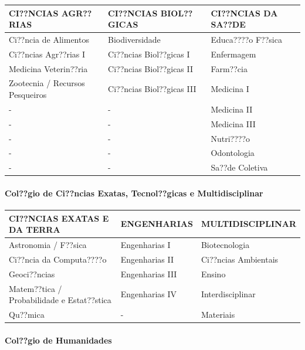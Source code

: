 \documentclass[]{article}
\let\oldparagraph\paragraph
\renewcommand{\paragraph}[1]{\oldparagraph{#1}\mbox{}}
\begin{document}
\begin{longtable}[]{@{}lll@{}}
\toprule
CI??NCIAS AGR??RIAS & CI??NCIAS BIOL??GICAS & CI??NCIAS DA
SA??DE\tabularnewline
\midrule
\endhead
Ci??ncia de Alimentos & Biodiversidade & Educa????o
F??sica\tabularnewline
Ci??ncias Agr??rias I & Ci??ncias Biol??gicas I &
Enfermagem\tabularnewline
Medicina Veterin??ria & Ci??ncias Biol??gicas II &
Farm??cia\tabularnewline
Zootecnia / Recursos Pesqueiros & Ci??ncias Biol??gicas III & Medicina
I\tabularnewline
- & - & Medicina II\tabularnewline
- & - & Medicina III\tabularnewline
- & - & Nutri????o\tabularnewline
- & - & Odontologia\tabularnewline
- & - & Sa??de Coletiva\tabularnewline
\bottomrule
\end{longtable}

\paragraph{Col??gio de Ci??ncias Exatas, Tecnol??gicas e
Multidisciplinar}\label{colgio-de-cincias-exatas-tecnolgicas-e-multidisciplinar}

\begin{longtable}[]{@{}lll@{}}
\toprule
CI??NCIAS EXATAS E DA TERRA & ENGENHARIAS &
MULTIDISCIPLINAR\tabularnewline
\midrule
\endhead
Astronomia / F??sica & Engenharias I & Biotecnologia\tabularnewline
Ci??ncia da Computa????o & Engenharias II & Ci??ncias
Ambientais\tabularnewline
Geoci??ncias & Engenharias III & Ensino\tabularnewline
Matem??tica / Probabilidade e Estat??stica & Engenharias IV &
Interdisciplinar\tabularnewline
Qu??mica & - & Materiais\tabularnewline
\bottomrule
\end{longtable}

\paragraph{Col??gio de Humanidades}\label{colgio-de-humanidades}
\end{document}
